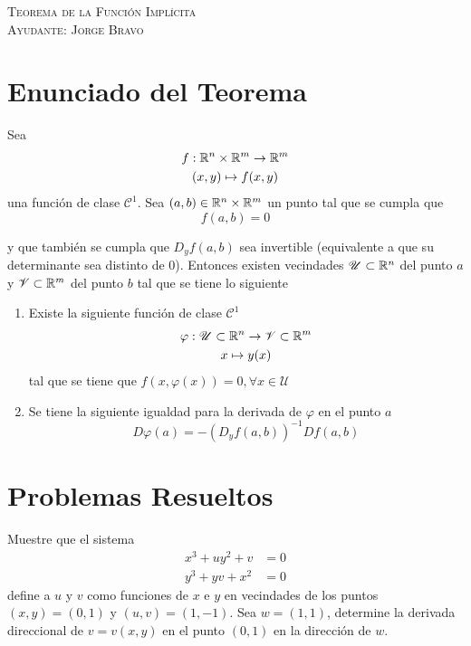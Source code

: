 \documentclass[a4paper,oneside,10.5pt]{article}
\begin{document}
\begin{center}
{\Large \textsc{Teorema de la Función Implícita}}\\
\vspace{1em}
\textsc{Ayudante: Jorge Bravo}\\
\end{center}

\section*{Enunciado del Teorema}
 Sea 
\begin{gather*}
    f : \mathbb{R}^n \times \mathbb{R}^m \to \mathbb{R}^m\\
    (x, y) \mapsto f(x, y)
\end{gather*}
una función de clase $\mathcal{C}^{1}$. Sea $(a, b) \in \mathbb{R}^n \times \mathbb{R}^m$ un punto tal que se cumpla que
\begin{equation*}
    f(a, b) = 0
\end{equation*}

y que también se cumpla que $D_{y}f(a, b)$ sea invertible (equivalente a que su determinante sea distinto de $0$). Entonces existen vecindades $\mathcal{U} \subset \mathbb{R}^n$ del punto $a$ y $\mathcal{V} \subset \mathbb{R}^m$ del punto $b$ tal que se tiene lo siguiente

\begin{enumerate}
    \item Existe la siguiente funci\'on de clase $\mathcal{C}^1$
    \begin{gather*}
        \varphi : \mathcal{U} \subset \mathbb{R}^n \to \mathcal{V} \subset \mathbb{R}^m\\
        x \mapsto y(x)
    \end{gather*}
    tal que se tiene que $f(x, \varphi(x)) = 0, \forall x \in \mathcal{U}$
    \item Se tiene la siguiente igualdad para la derivada de $\varphi$ en el punto $a$
    \begin{equation*}
        D\varphi(a) = -(D_{y}f(a, b))^{-1} Df(a, b)
    \end{equation*}
\end{enumerate}

\section*{Problemas Resueltos}
\prob Muestre que el sistema
\begin{align*}
    x^3 + uy^2 + v &= 0\\
    y^3 + yv + x^2 &= 0
\end{align*}
define a $u$ y $v$ como funciones de $x$ e $y$ en vecindades de los puntos $(x, y) = (0, 1)$ y $(u, v) = (1, -1)$. Sea $w = (1, 1)$, determine la derivada direccional de $v = v(x, y)$ en el punto $(0, 1)$ en la dirección de $w$.
\end{document}
